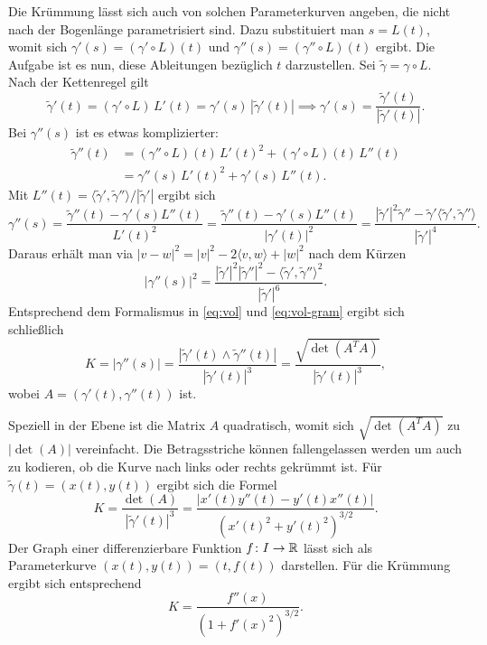 Die Krümmung lässt sich auch von solchen Parameterkurven angeben,
die nicht nach der Bogenlänge parametrisiert sind. Dazu substituiert
man $s=L(t)$, womit sich $\gamma'(s) = (\gamma'\circ L)(t)$ und
$\gamma''(s)=(\gamma''\circ L)(t)$ ergibt. Die Aufgabe ist es nun, diese
Ableitungen bezüglich $t$ darzustellen. Sei $\tilde\gamma = \gamma\circ L$.
Nach der Kettenregel gilt%
\begin{equation}
\tilde\gamma'(t) = (\gamma'\circ L)\,L'(t) = \gamma'(s)\,|\tilde\gamma'(t)|
\implies \gamma'(s) = \frac{\tilde\gamma'(t)}{|\tilde\gamma'(t)|}.
\end{equation}
Bei $\gamma''(s)$ ist es etwas komplizierter:
\begin{align}
\tilde\gamma''(t)
&= (\gamma''{\circ}L)(t)\,L'(t)^2+(\gamma'{\circ}L)(t)\,L''(t)\\
&= \gamma''(s)\,L'(t)^2+\gamma'(s)\,L''(t).
\end{align}
Mit $L''(t)=\langle\tilde\gamma',\tilde\gamma''\rangle/|\tilde\gamma'|$
ergibt sich
\begin{equation}
\gamma''(s) = \frac{\tilde\gamma''(t)-\gamma'(s)L''(t)}{L'(t)^2}
= \frac{\tilde\gamma''(t)-\gamma'(s)L''(t)}{|\gamma'(t)|^2}
= \frac{
|\tilde\gamma'|^2\tilde\gamma''
-\tilde\gamma'\langle\tilde\gamma',\tilde\gamma''\rangle
}{|\tilde\gamma'|^4}.
\end{equation}
Daraus erhält man via $|v-w|^2 = |v|^2-2\langle v,w\rangle+|w|^2$ nach
dem Kürzen
\begin{equation}
|\gamma''(s)|^2 = \frac{
|\tilde\gamma'|^2|\tilde\gamma''|^2
-\langle\tilde\gamma',\tilde\gamma''\rangle^2
}{|\tilde\gamma'|^6}.
\end{equation}
Entsprechend dem Formalismus in \eqref{eq:vol} und \eqref{eq:vol-gram}
ergibt sich schließlich
\begin{equation}\label{eq:Kruemmung-t}
K = |\gamma''(s)| = \frac{|\tilde\gamma'(t)\wedge\tilde\gamma''(t)|}{|\tilde\gamma'(t)|^3}
= \frac{\sqrt{\det(A^T A)}}{|\tilde\gamma'(t)|^3},
\end{equation}
wobei $A=(\gamma'(t),\gamma''(t))$ ist.

Speziell in der Ebene ist die
Matrix $A$ quadratisch, womit sich $\sqrt{\det(A^T A)}$
zu $|\det(A)|$ vereinfacht. Die Betragsstriche können fallengelassen
werden um auch zu kodieren, ob die Kurve nach links oder rechts
gekrümmt ist. Für $\tilde\gamma(t)=(x(t),y(t))$ ergibt
sich die Formel%
\begin{equation}
K = \frac{\det(A)}{|\tilde\gamma'(t)|^3}
= \frac{|x'(t)y''(t)-y'(t)x''(t)|}{(x'(t)^2+y'(t)^2)^{3/2}}.
\end{equation}
Der Graph einer differenzierbare Funktion $f\colon I\to \mathbb R$ lässt sich
als Parameterkurve $(x(t),y(t))=(t,f(t))$ darstellen. Für die
Krümmung ergibt sich entsprechend
\begin{equation}
K = \frac{f''(x)}{(1+f'(x)^2)^{3/2}}.
\end{equation}

